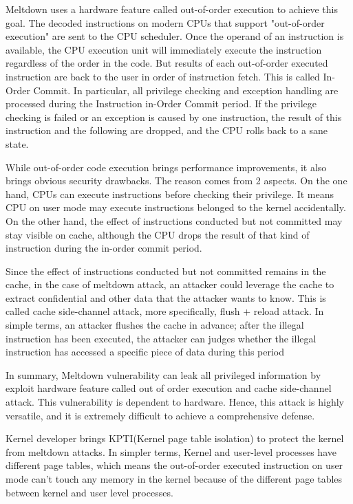 Meltdown uses a hardware feature called out-of-order execution to 
achieve this goal. The decoded instructions on modern CPUs that support 
"out-of-order execution" are sent to the CPU scheduler. Once the operand 
of an instruction is available, the CPU execution unit will immediately 
execute the instruction regardless of the order in the code. But results of 
each out-of-order executed instruction are back to the user in order of 
instruction fetch. This is called In-Order Commit. In particular,  
all privilege checking and exception handling are processed during 
the Instruction in-Order Commit period. If the privilege checking is 
failed or an exception is caused by one instruction, the result of this 
instruction and the following are dropped, and the CPU rolls back to a sane state. 

While out-of-order code execution brings performance improvements, 
it also brings obvious security drawbacks. The reason comes from 2
 aspects. On the one hand, CPUs can execute instructions before checking 
 their privilege. It means CPU on user mode may execute instructions 
 belonged to the kernel accidentally. On the other hand, the effect of 
 instructions conducted but not committed may stay visible on cache, 
 although the CPU drops the result of that kind of instruction during 
 the in-order commit period.

Since the effect of instructions conducted but not committed remains 
in the cache, in the case of meltdown attack, an attacker could leverage
 the cache to extract confidential and other data that the attacker wants
  to know. This is called cache side-channel attack, more specifically, 
  flush + reload attack. In simple terms, an attacker flushes the cache 
  in advance; after the illegal instruction has been executed, the 
  attacker can judges whether the illegal instruction has accessed a 
  specific piece of data during this period

In summary, Meltdown vulnerability can leak all privileged 
information by exploit hardware feature called out of order execution 
and cache side-channel attack. This vulnerability is dependent to hardware.
 Hence, this attack is highly versatile, and it is extremely difficult to achieve a comprehensive defense.

Kernel developer brings KPTI(Kernel page table isolation) to protect 
the kernel from meltdown attacks. In simpler terms,  Kernel and 
user-level processes have different page tables, which means the 
out-of-order executed instruction on user mode can't touch any memory 
in the kernel because of the different page tables between kernel and user level processes.
